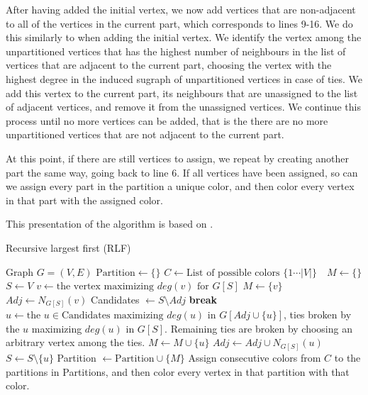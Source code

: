 \documentclass[a4paper]{article}
\newcommand{\algorithmicbreak}{\textbf{break}}
\newcommand{\BREAK}{\STATE \algorithmicbreak}
\begin{document}
After having added the initial vertex, we now add vertices that are
non-adjacent to all of the vertices in the current part,
which corresponds to lines 9-16. We do this similarly
to when adding the initial vertex. We identify the vertex among the
unpartitioned vertices that has the highest number of neighbours in the list of
vertices that are adjacent to the current part, choosing the vertex with the
highest degree in the induced sugraph of unpartitioned vertices in case of
ties.  We add this vertex to the current part, its neighbours that are
unassigned to the list of adjacent vertices, and remove it from the unassigned
vertices. We continue this process until no more vertices can be added, that is the 
there are no more unpartitioned vertices that are not adjacent to the current part.

At this point, if there are still vertices to assign, we repeat by creating
another part the same way, going back to line 6. If all vertices have been assigned, so can we assign every part in
the partition a unique color, and then color every vertex in that part with the
assigned color.

This presentation of the algorithm is based on \cite{Constructive}.
\begin{algorithm}[H]
  \caption{Recursive largest first (RLF)}
  \label{alg:rlf}
  \begin{algorithmic}[1]
      \REQUIRE Graph $G = (V,E)$
      \STATE $\text{Partition} \leftarrow \{\}$
      \STATE $C \leftarrow \text{List of possible colors $\{1 \cdots |V| \}$ }$
      \STATE $M \leftarrow \{\}$
      \STATE $S \leftarrow V$
        \STATE $v \leftarrow \text{the vertex maximizing $deg(v)$ for $G[S]$} $
        \STATE $M \leftarrow \{v\}$
        \STATE $Adj \leftarrow N_{G[S]}(v)$
            \STATE Candidates $\leftarrow S \setminus Adj$
                \BREAK
            \ENDIF
            \STATE $u \leftarrow \text{the $u \in \text{Candidates}$ maximizing $deg(u)$ in $G[Adj \cup \{u\}]$}$, ties broken by 
            the $u$ maximizing $deg(u)$ in $G[S]$. Remaining ties are broken by
            choosing an arbitrary vertex among the ties.
            \STATE $M \leftarrow M \cup \{u\}$
            \STATE $Adj \leftarrow Adj \cup N_{G[S]}(u)$
            \STATE $S \leftarrow S \setminus \{u\}$
        \ENDWHILE
        \STATE Partition $\leftarrow \text{Partition} \cup \{M\}$ 
      \ENDWHILE
      \STATE Assign consecutive colors from $C$ to the partitions in Partitions,
      and then color every vertex in that partition with that color.
  \end{algorithmic}
\end{algorithm}
\end{document}
